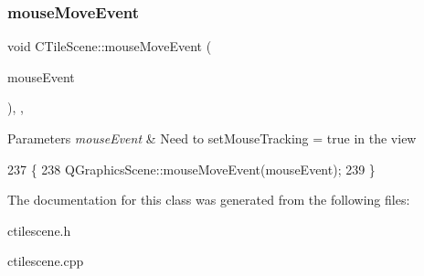 \subsubsection{\texorpdfstring{mouse\+Move\+Event}{mouseMoveEvent}}
{\footnotesize\ttfamily void C\+Tile\+Scene\+::mouse\+Move\+Event (\begin{DoxyParamCaption}\item[{Q\+Graphics\+Scene\+Mouse\+Event $\ast$}]{mouse\+Event }\end{DoxyParamCaption})\hspace{0.3cm}{\ttfamily [override]}, {\ttfamily [protected]}, {\ttfamily [slot]}}


\begin{DoxyParams}{Parameters}
{\em mouse\+Event} & Need to set\+Mouse\+Tracking = true in the view \\
\hline
\end{DoxyParams}

\begin{DoxyCode}
237                                                                     \{
238     QGraphicsScene::mouseMoveEvent(mouseEvent);
239 \}
\end{DoxyCode}


The documentation for this class was generated from the following files\+:\begin{DoxyCompactItemize}
\item 
ctilescene.\+h\item 
ctilescene.\+cpp\end{DoxyCompactItemize}
